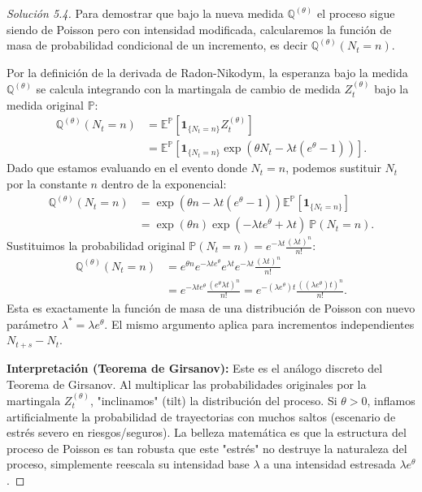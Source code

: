 \documentclass[10pt,a4paper]{article}
\begin{document}
\begin{proof}[Solución  5.4]
    Para demostrar que bajo la nueva medida $\mathbb{Q}^{(\theta)}$ el proceso sigue siendo de Poisson pero con intensidad modificada, calcularemos la función de masa de probabilidad condicional de un incremento, es decir $\mathbb{Q}^{(\theta)}(N_t = n)$.
    
    Por la definición de la derivada de Radon-Nikodym, la esperanza bajo la medida $\mathbb{Q}^{(\theta)}$ se calcula integrando con la martingala de cambio de medida $Z_t^{(\theta)}$ bajo la medida original $\mathbb{P}$:
    \begin{align*}
        \mathbb{Q}^{(\theta)}(N_t = n) &= \mathbb{E}^{\mathbb{P}} \left[ \mathbf{1}_{\{N_t = n\}} Z_t^{(\theta)} \right] \\
        &= \mathbb{E}^{\mathbb{P}} \left[ \mathbf{1}_{\{N_t = n\}} \exp(\theta N_t - \lambda t(e^\theta - 1)) \right].
    \end{align*}
    Dado que estamos evaluando en el evento donde $N_t = n$, podemos sustituir $N_t$ por la constante $n$ dentro de la exponencial:
    \begin{align*}
        \mathbb{Q}^{(\theta)}(N_t = n) &= \exp(\theta n - \lambda t(e^\theta - 1)) \mathbb{E}^{\mathbb{P}} \left[ \mathbf{1}_{\{N_t = n\}} \right] \\
        &= \exp(\theta n) \exp(-\lambda t e^\theta + \lambda t) \ \mathbb{P}(N_t = n).
    \end{align*}
    Sustituimos la probabilidad original $\mathbb{P}(N_t = n) = e^{-\lambda t} \frac{(\lambda t)^n}{n!}$:
    \begin{align*}
        \mathbb{Q}^{(\theta)}(N_t = n) &= e^{\theta n} e^{-\lambda t e^\theta} e^{\lambda t} e^{-\lambda t} \frac{(\lambda t)^n}{n!} \\
        &= e^{-\lambda t e^\theta} \frac{(e^\theta \lambda t)^n}{n!} = e^{-(\lambda e^\theta) t} \frac{((\lambda e^\theta) t)^n}{n!}.
    \end{align*}
    Esta es exactamente la función de masa de una distribución de Poisson con nuevo parámetro $\lambda^* = \lambda e^\theta$. El mismo argumento aplica para incrementos independientes $N_{t+s} - N_t$.
    
    \textbf{Interpretación (Teorema de Girsanov):} 
    Este es el análogo discreto del Teorema de Girsanov. Al multiplicar las probabilidades originales por la martingala $Z_t^{(\theta)}$, "inclinamos" (tilt) la distribución del proceso. Si $\theta > 0$, inflamos artificialmente la probabilidad de trayectorias con muchos saltos (escenario de estrés severo en riesgos/seguros). La belleza matemática es que la estructura del proceso de Poisson es tan robusta que este "estrés" no destruye la naturaleza del proceso, simplemente reescala su intensidad base $\lambda$ a una intensidad estresada $\lambda e^\theta$.
\end{proof}
\end{document}
